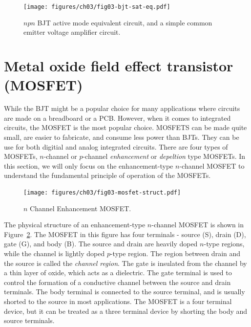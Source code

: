 \begin{figure}[b]
    \centering
    \texttt{[image: figures/ch03/fig03-bjt-sat-eq.pdf]}
    \caption{$npn$ BJT active mode equivalent circuit, and a simple common emitter voltage amplifier circuit.}
    \label{fig:03-bjt-sat-eqt}
\end{figure}

\section{Metal oxide field effect transistor (MOSFET)}
While the BJT might be a popular choice for many applications where circuits are made on a breadboard or a PCB. However, when it comes to integrated circuits, the MOSFET is the most popular choice. MOSFETS can be made quite small, are easier to fabricate, and consume less power than BJTs. They can be use for both digitial and analog integrated circuits. There are four types of MOSFETs, $n$-channel or $p$-channel \textit{enhancement} or \textit{depeltion} type MOSFETs. In this section, we will only focus on the enhancement-type $n$-channel MOSFET to understand the fundamental principle of operation of the MOSFETs.

\begin{figure}[t]
    \centering
    \texttt{[image: figures/ch03/fig03-mosfet-struct.pdf]}
    \caption{$n$ Channel Enhancement MOSFET.}
    \label{fig:03-mosfet-struct}
\end{figure}

The physical structure of an enhancement-type $n$-channel MOSFET is shown in Figure~\ref{fig:03-mosfet-struct}. The MOSFET in this figure has four terminals - source (S), drain (D), gate (G), and body (B). The source and drain are heavily doped $n$-type regions, while the channel is lightly doped $p$-type region. The region between drain and the source is called the \textit{channel region}. The gate is insulated from the channel by a thin layer of oxide, which acts as a dielectric. The gate terminal is used to control the formation of a conductive channel between the source and drain terminals. The body terminal is connected to the source terminal, and is usually shorted to the source in most applications. The MOSFET is a four terminal device, but it can be treated as a three terminal device by shorting the body and source terminals.

